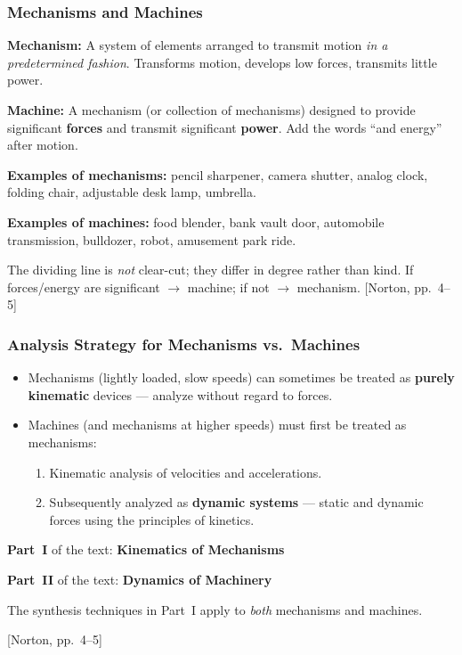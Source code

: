 \documentclass[10pt,aspectratio=43]{beamer}
\newcommand{\pref}[1]{\vfill\hfill{\scriptsize\color{gray}[Norton, pp.~#1]}}
\begin{document}

\begin{frame}
\frametitle{Mechanisms and Machines}

\begin{yellowbox}
\textbf{Mechanism:} A system of elements arranged to transmit motion \emph{in a predetermined fashion}. Transforms motion, develops low forces, transmits little power.
\end{yellowbox}

\vspace{4pt}
\begin{yellowbox}
\textbf{Machine:} A mechanism (or collection of mechanisms) designed to provide significant \textbf{forces} and transmit significant \textbf{power}. Add the words ``and energy'' after motion.
\end{yellowbox}

\vspace{6pt}
\textbf{Examples of mechanisms:} pencil sharpener, camera shutter, analog clock, folding chair, adjustable desk lamp, umbrella.

\vspace{4pt}
\textbf{Examples of machines:} food blender, bank vault door, automobile transmission, bulldozer, robot, amusement park ride.

\vspace{6pt}
The dividing line is \emph{not} clear-cut; they differ in degree rather than kind. If forces/energy are significant $\to$ machine; if not $\to$ mechanism.
\pref{4--5}
\end{frame}

\begin{frame}
\frametitle{Analysis Strategy for Mechanisms vs.\ Machines}

\begin{itemize}
  \item Mechanisms (lightly loaded, slow speeds) can sometimes be treated as \textbf{purely kinematic} devices --- analyze without regard to forces.
  \item Machines (and mechanisms at higher speeds) must first be treated as mechanisms:
  \begin{enumerate}
    \item Kinematic analysis of velocities and accelerations.
    \item Subsequently analyzed as \textbf{dynamic systems} --- static and dynamic forces using the principles of kinetics.
  \end{enumerate}
\end{itemize}

\vspace{6pt}
\begin{yellowbox}
\textbf{Part~I} of the text: \textbf{Kinematics of Mechanisms}

\textbf{Part~II} of the text: \textbf{Dynamics of Machinery}

The synthesis techniques in Part~I apply to \emph{both} mechanisms and machines.
\end{yellowbox}
\pref{4--5}
\end{frame}
\end{document}

